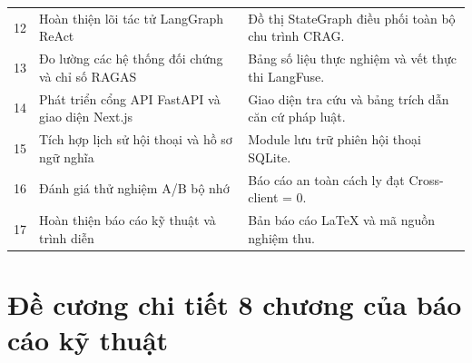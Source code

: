 \begin{table}[htbp]
\begin{tabularx}{\textwidth}{C{1.2cm} L{5.8cm} Y}
12 & Hoàn thiện lõi tác tử LangGraph ReAct & Đồ thị StateGraph điều phối toàn bộ chu trình CRAG. \\
13 & Đo lường các hệ thống đối chứng và chỉ số RAGAS & Bảng số liệu thực nghiệm và vết thực thi LangFuse. \\
14 & Phát triển cổng API FastAPI và giao diện Next.js & Giao diện tra cứu và bảng trích dẫn căn cứ pháp luật. \\
15 & Tích hợp lịch sử hội thoại và hồ sơ ngữ nghĩa & Module lưu trữ phiên hội thoại SQLite. \\
16 & Đánh giá thử nghiệm A/B bộ nhớ & Báo cáo an toàn cách ly đạt Cross-client = 0. \\
17 & Hoàn thiện báo cáo kỹ thuật và trình diễn & Bản báo cáo LaTeX và mã nguồn nghiệm thu. \\
\bottomrule
\end{tabularx}
\end{table}

\section{Đề cương chi tiết 8 chương của báo cáo kỹ thuật}

